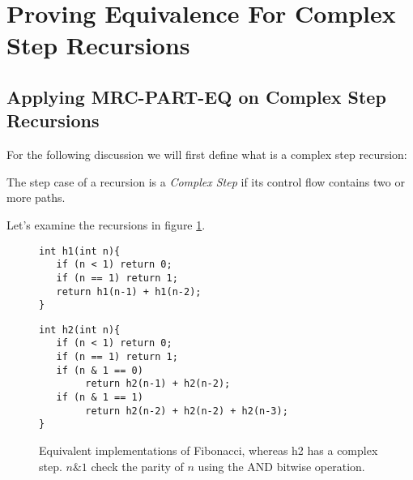 \section{Proving Equivalence For Complex Step Recursions}
\label{sec:multistep}
\subsection{Applying MRC-PART-EQ on Complex Step Recursions}
For the following discussion we will first define what is a complex step recursion:
\begin{definition}
The step case of a recursion is a \emph{Complex Step} if its control flow contains two or more paths.
\end{definition}
Let's examine the recursions in figure \ref{fig:f1f2cond}.
\begin{figure}[h]
\begin{center}
\begin{minipage}{7 cm}
\begin{lstlisting}
int h1(int n){
   if (n < 1) return 0;
   if (n == 1) return 1; 
   return h1(n-1) + h1(n-2);
}
\end{lstlisting}
\end{minipage}
\begin{minipage}{7 cm}
\begin{lstlisting}
int h2(int n){
   if (n < 1) return 0;
   if (n == 1) return 1; 
   if (n & 1 == 0)
        return h2(n-1) + h2(n-2);
   if (n & 1 == 1)
        return h2(n-2) + h2(n-2) + h2(n-3);
}
\end{lstlisting}
\end{minipage}
\caption{Equivalent implementations of Fibonacci, whereas h2 has a complex step. $n \& 1$ check the parity of $n$ using the AND bitwise operation.}
\label{fig:f1f2cond}
\end{center}
\end{figure}

